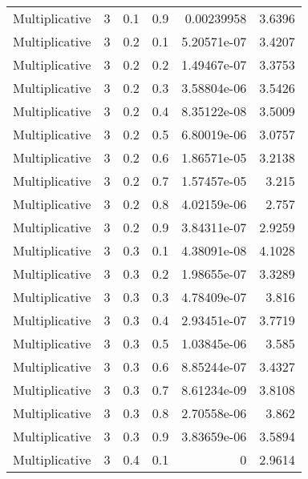 \documentclass{article}
\begin{document}
\begin{longtable}[H]{lrrrrr}
 Multiplicative &       3 &   0.1 &            0.9 &      0.00239958  &          3.6396 \\
 Multiplicative &       3 &   0.2 &            0.1 &      5.20571e-07 &          3.4207 \\
 Multiplicative &       3 &   0.2 &            0.2 &      1.49467e-07 &          3.3753 \\
 Multiplicative &       3 &   0.2 &            0.3 &      3.58804e-06 &          3.5426 \\
 Multiplicative &       3 &   0.2 &            0.4 &      8.35122e-08 &          3.5009 \\
 Multiplicative &       3 &   0.2 &            0.5 &      6.80019e-06 &          3.0757 \\
 Multiplicative &       3 &   0.2 &            0.6 &      1.86571e-05 &          3.2138 \\
 Multiplicative &       3 &   0.2 &            0.7 &      1.57457e-05 &          3.215  \\
 Multiplicative &       3 &   0.2 &            0.8 &      4.02159e-06 &          2.757  \\
 Multiplicative &       3 &   0.2 &            0.9 &      3.84311e-07 &          2.9259 \\
 Multiplicative &       3 &   0.3 &            0.1 &      4.38091e-08 &          4.1028 \\
 Multiplicative &       3 &   0.3 &            0.2 &      1.98655e-07 &          3.3289 \\
 Multiplicative &       3 &   0.3 &            0.3 &      4.78409e-07 &          3.816  \\
 Multiplicative &       3 &   0.3 &            0.4 &      2.93451e-07 &          3.7719 \\
 Multiplicative &       3 &   0.3 &            0.5 &      1.03845e-06 &          3.585  \\
 Multiplicative &       3 &   0.3 &            0.6 &      8.85244e-07 &          3.4327 \\
 Multiplicative &       3 &   0.3 &            0.7 &      8.61234e-09 &          3.8108 \\
 Multiplicative &       3 &   0.3 &            0.8 &      2.70558e-06 &          3.862  \\
 Multiplicative &       3 &   0.3 &            0.9 &      3.83659e-06 &          3.5894 \\
 Multiplicative &       3 &   0.4 &            0.1 &      0           &          2.9614 \\

\end{longtable}
\end{document}
